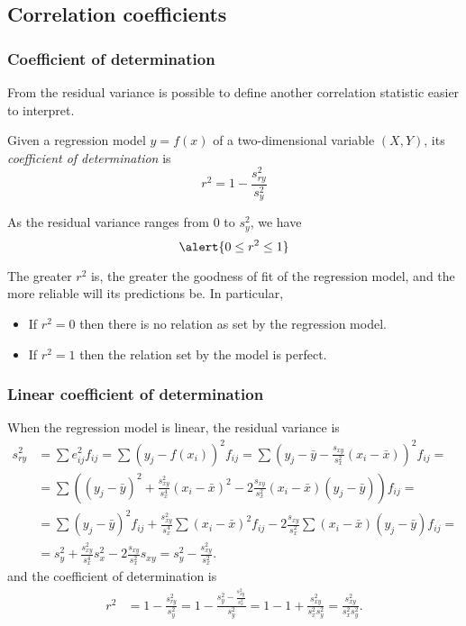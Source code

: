 \subsection{Correlation coefficients}
\begin{frame}
\frametitle{Coefficient of determination}
From the residual variance is possible to define another correlation statistic easier to interpret.   
\begin{definition}
Given a regression model  $y=f(x)$ of a two-dimensional variable $(X,Y)$, its \emph{coefficient of determination} is
\[
r^2 = 1- \frac{s_{ry}^2}{s_y^2}
\]
\end{definition}

As the residual variance ranges from 0 to $s_y^2$, we have
\[
\alert{0\leq r^2\leq 1}
\]

The greater $r^2$ is, the greater the goodness of fit of the regression model, and the more reliable will its
predictions be. 
In particular, 
\begin{itemize}
\item If $r^2 =0$ then there is no relation as set by the regression model.
\item If $r^2=1$ then the relation set by the model is perfect. 
\end{itemize}
\end{frame}


\begin{frame}
\frametitle{Linear coefficient of determination}
When the regression model is linear, the residual variance is
\begin{align*}
s_{ry}^2 & = \sum e_{ij}^2f_{ij} = \sum (y_j - f(x_i))^2f_{ij} = \sum \left(y_j - \bar y -\frac{s_{xy}}{s_x^2}(x_i-\bar x) \right)^2f_{ij}=\\
& = \sum \left((y_j - \bar y)^2 +\frac{s_{xy}^2}{s_x^4}(x_i-\bar x)^2 - 2\frac{s_{xy}}{s_x^2}(x_i-\bar x)(y_j -\bar y)\right)f_{ij} =\\
& = \sum (y_j - \bar y)^2f_{ij} +\frac{s_{xy}^2}{s_x^4}\sum (x_i-\bar x)^2f_{ij}- 2\frac{s_{xy}}{s_x^2}\sum (x_i-\bar x)(y_j -\bar y)f_{ij}=\\
& = s_y^2 + \frac{s_{xy}^2}{s_x^4}s_x^2 - 2 \frac{s_{xy}}{s_x^2}s_{xy} = s_y^2 - \frac{s_{xy}^2}{s_x^2}.
\end{align*}
and the coefficient of determination is  
\begin{align*}
r^2 &= 1- \frac{s_{ry}^2}{s_y^2} = 1- \frac{s_y^2 - \frac{s_{xy}^2}{s_x^2}}{s_y^2} = 1 - 1 + \frac{s_{xy}^2}{s_x^2s_y^2} = \frac{s_{xy}^2}{s_x^2s_y^2}.
\end{align*}
\end{frame}


